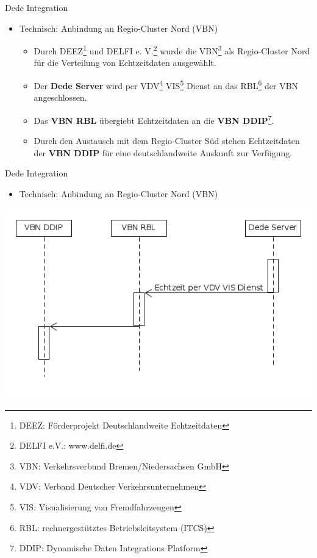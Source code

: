 \begin{frame}{Dede Integration}
  \begin{itemize}
  \item Technisch: Anbindung an Regio-Cluster Nord (VBN)
    \begin{itemize}
    \item Durch DEEZ\footnote{DEEZ: Förderprojekt Deutschlandweite Echtzeitdaten} und DELFI e. V.\footnote{DELFI e.V.: www.delfi.de} wurde die VBN\footnote{VBN: Verkehrsverbund Bremen/Niedersachsen GmbH} als Regio-Cluster Nord für die Verteilung von Echtzeitdaten ausgewählt.
    \item Der \textbf{Dede Server} wird per VDV\footnote{VDV: Verband Deutscher Verkehrsunternehmen} VIS\footnote{VIS: Visualisierung von Fremdfahrzeugen} Dienst an das RBL\footnote{RBL: rechnergestütztes Betriebsleitsystem (ITCS)} der VBN angeschlossen.
    \item Das \textbf{VBN RBL} übergiebt Echtzeitdaten an die \textbf{VBN DDIP}\footnote{DDIP: Dynamische Daten Integrations Platform}.
      \item Durch den Austausch mit dem Regio-Cluster Süd stehen Echtzeitdaten der \textbf{VBN DDIP} für eine deutschlandweite Auskunft zur Verfügung.
    \end{itemize}
  \end{itemize}
\end{frame}

\begin{frame}{Dede Integration}
  \begin{itemize}
  \item Technisch: Anbindung an Regio-Cluster Nord (VBN)
  \end{itemize}
  \includegraphics[width=0.75\paperwidth]{dede/dede-vbn-ddip}
\end{frame}

